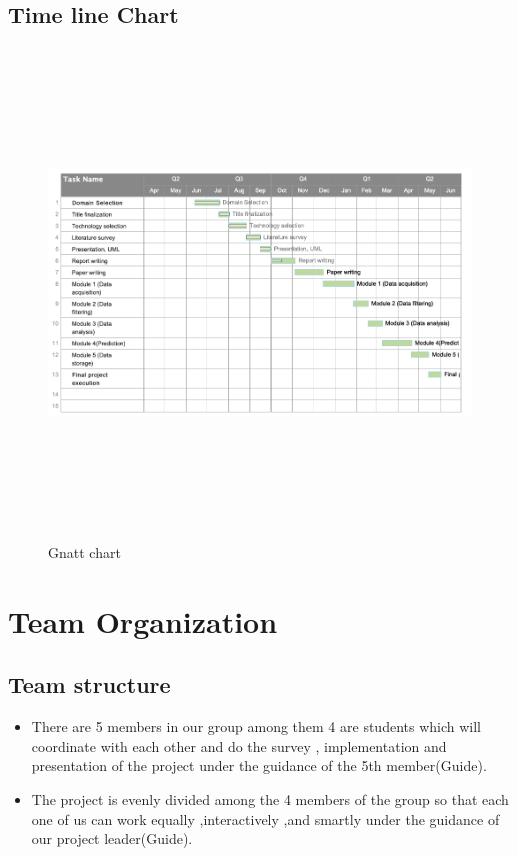 \documentclass[oneside,a4paper,12pt]{book}
\begin{document}
\subsection{Time line Chart}
\begin{figure}[h!]
  \centering
  \includegraphics[width=15cm,
  height=13cm]{gnattchart.png}
  \caption{Gnatt chart}
\end{figure}
\section{Team Organization}
\subsection{Team structure}
\begin{itemize}
    \item There are 5 members in our group among them 4 are students which will coordinate with each other and do the survey , implementation and presentation of the project under the guidance of the 5th member(Guide).
    \item The project is evenly divided among the 4 members of the group so that each one of us can work equally ,interactively ,and smartly under the guidance of our project leader(Guide).
\end{itemize}
\end{document}
